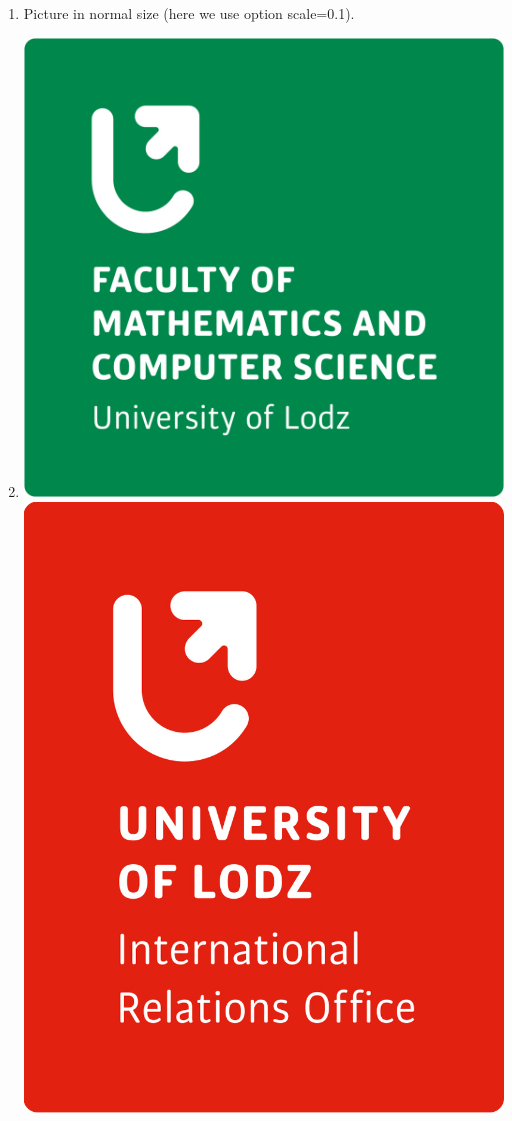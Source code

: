 \documentclass{article}
\begin{document}
\begin{enumerate}
  \item Picture in normal size (here we use option scale=0.1).
  \item[] \includegraphics[scale=0.1]{img/logo.jpg} \hspace{2mm} \includegraphics[scale=0.1]{img/logo-1.jpg}

\end{enumerate}
\end{document}
